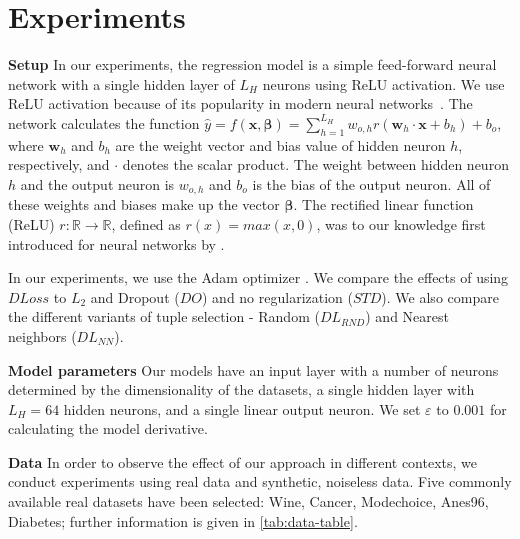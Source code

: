 \documentclass[conference]{IEEEtran}
\begin{document}

\section{Experiments}\label{sec:experiments}


\textbf{Setup} In our experiments, the regression model is a simple feed-forward neural network with a single hidden layer of $L_H$ neurons using ReLU activation.
We use ReLU activation because of its popularity in modern neural networks~\cite{goodfellow2016deep}.
The network calculates the function
$\hat{y} = f(\mathbf{x},\boldsymbol{\beta}) =
\sum^{L_H}_{h=1} w_{o,h} r(\mathbf{w}_{h} \cdot \mathbf{x} + b_{h}) + b_{o}$, where $\mathbf{w}_{h}$ and ${b}_{h}$ are the weight vector and bias value of hidden neuron $h$, respectively, and $\cdot$ denotes the scalar product.
The weight between hidden neuron $h$ and the output neuron is $w_{o,h}$ and $b_{o}$ is the bias of the output neuron. 
All of these weights and biases make up the vector $\boldsymbol{\beta}$. 
The rectified linear function (ReLU) $r:\mathbb{R}\rightarrow\mathbb{R}$, defined as $r(x) = max(x,0)$, was to our knowledge first introduced for neural networks by \cite{fukushima1975relu}. 

In our experiments, we use the Adam optimizer \cite{kingma2015adam}.
We compare the effects of using ${DLoss}$ to $L_2$ and Dropout ($DO$) and no regularization ($STD$). 
We also compare the different variants of tuple selection - Random ($DL_{RND}$) and Nearest neighbors ($DL_{NN}$). 

\textbf{Model parameters} Our models have an input layer with a number of neurons determined by the dimensionality of the datasets, a single hidden layer with $L_H = 64$ hidden neurons, and a single linear output neuron. 
We set $\varepsilon$ to $0.001$ for calculating the model derivative. 


\textbf{Data}
In order to observe the effect of our approach in different contexts, we conduct experiments using real data and synthetic, noiseless data. 
Five commonly available real datasets have been selected: Wine, Cancer, Modechoice, Anes96, Diabetes; further information is given in \autoref{tab:data-table}.
\end{document}
